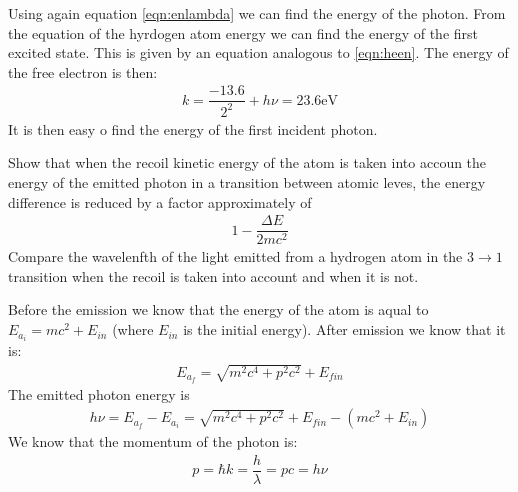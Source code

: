 \documentclass[../AppuntiStruttura.tex]{subfiles}
\begin{document}
	\begin{sol}
		Using again equation \ref{eqn:enlambda} we can find the energy of the photon. From the equation of the hyrdogen atom energy we can find the energy of the first excited state. This is given by an equation analogous to \ref{eqn:heen}. The energy of the free electron is then:
		\begin{gather}
			k=\dfrac{-13.6}{2^{2}}+h\nu=23.6\si{\electronvolt}
		\end{gather}
		It is then easy o find the energy of the first incident photon.
	\end{sol}
	\begin{exe}
		Show that when the recoil kinetic energy of the atom is taken into accoun the energy of the emitted photon in a transition between atomic leves, the energy difference is reduced by a factor approximately of
		\begin{gather*}
			1-\dfrac{\Delta E}{2mc^{2}}
		\end{gather*}
		Compare the wavelenfth of the light emitted from a hydrogen atom in the $ 3\to 1 $ transition when the recoil is taken into account and when it is not. 
	\end{exe}
	\begin{sol}
		Before the emission we know that the energy of the atom is aqual to $ E_{a_{i}}=mc^{2}+E_{in} $ (where $ E_{in} $ is the initial energy). After emission we know that it is:
		\begin{gather*}
		E_{a_{f}}=\sqrt{m^{2}c^{4}+p^{2}c^{2}}+E_{fin}
		\end{gather*}
		The emitted photon energy is
		\begin{gather*}
			h\nu=E_{a_{f}}-E_{a_{i}}=\sqrt{m^{2}c^{4}+p^{2}c^{2}}+E_{fin}-\left(mc^{2}+E_{in}\right)
		\end{gather*}
		We know that the momentum of the photon is:
		\begin{gather*}
			p=\hbar k=\dfrac{h}{\lambda}=pc=h\nu 
		\end{gather*}
	\end{sol}
\end{document}
